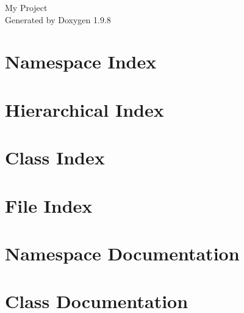 \documentclass[twoside]{book}
\newcommand{\+}{\discretionary{\mbox{\scriptsize$\hookleftarrow$}}{}{}}
\newcommand{\clearemptydoublepage}{%
    \newpage{\pagestyle{empty}\cleardoublepage}%
  }
\begin{document}
  \raggedbottom
    \hypersetup{pageanchor=false,
                bookmarksnumbered=true,
                pdfencoding=unicode
               }
  \begin{titlepage}
  \vspace*{7cm}
  \begin{center}%
  {\Large My Project}\\
  \vspace*{1cm}
  {\large Generated by Doxygen 1.9.8}\\
  \end{center}
  \end{titlepage}
  \clearemptydoublepage
  \tableofcontents
  \clearemptydoublepage
  \hypersetup{pageanchor=true}

\chapter{Namespace Index}

\chapter{Hierarchical Index}

\chapter{Class Index}

\chapter{File Index}

\chapter{Namespace Documentation}











\chapter{Class Documentation}
















\end{document}
